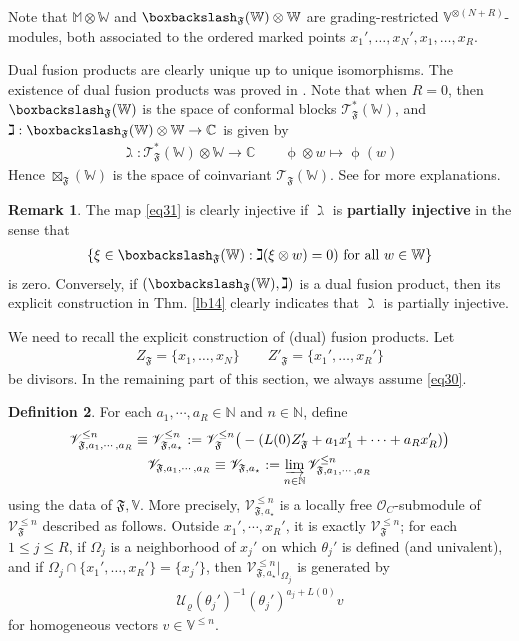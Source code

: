 \documentclass[11pt,b5paper,notitlepage]{article}
\theoremstyle{definition}
\newtheorem{df}{Definition}[section]
\newtheorem{rem}[df]{Remark}
\theoremstyle{plain}
\newcommand{\fk}{\mathfrak}
\newcommand{\SV}{\mathscr{V}}
\newcommand{\scr}{\mathscr}
\newcommand{\Vbb}{\mathbb V}
\newcommand{\Wbb}{\mathbb W}
\newcommand{\Mbb}{\mathbb M}
\newcommand{\Cbb}{\mathbb C}
\newcommand{\Nbb}{\mathbb N}
\newcommand{\<}{\left\langle}
\renewcommand{\>}{\right\rangle}
\newcommand{\MO}{\mathcal{O}}
\newcommand{\MU}{\mathcal{U}}
\newcommand{\ST}{\mathscr{T}}
\newcommand{\bbs}{\boxbackslash}
\newcommand{\ff}{\mathfrak{F}}
\numberwithin{equation}{section}
\begin{document}
Note that $\Mbb\otimes\Wbb$ and $\bbs_\fk F(\Wbb)\otimes\Wbb$ are grading-restricted $\Vbb^{\otimes{(N+R)}}$-modules, both associated to the ordered marked points $x_1',\dots,x_N',x_1,\dots,x_R$.

Dual fusion products are clearly unique up to unique isomorphisms. The existence of dual fusion products was proved in \cite[Thm. 3.31]{GZ1}. Note that when $R=0$, then  $\bbs_\ff(\Wbb)$ is the space of conformal blocks $\scr T_\ff^*(\Wbb)$, and $\gimel:\bbs_\ff(\Wbb)\otimes\Wbb\rightarrow\Cbb$ is given by
\begin{align*}
\gimel:\ST^*_\ff(\Wbb)\otimes\Wbb\rightarrow\Cbb\qquad \upphi\otimes w\mapsto\upphi(w)
\end{align*}
Hence $\boxtimes_{\fk F}(\Wbb)$ is the space of coinvariant $\scr T_{\fk F}(\Wbb)$. See \cite[Sec. 3.4]{GZ2} for more explanations.


\begin{rem}\label{lb15}
The map \eqref{eq31} is clearly injective if $\gimel$ is \textbf{partially injective} in the sense that
\begin{align*}
\{\xi\in\bbs_\ff(\Wbb):\gimel(\xi\otimes w)=0)\text{ for all }w\in\Wbb\}
\end{align*}
is zero.  Conversely, if $(\bbs_\ff(\Wbb),\gimel)$ is a dual fusion product, then its explicit construction in Thm. \ref{lb14} clearly indicates that $\gimel$ is partially injective.
\end{rem}


We need to recall the explicit construction of (dual) fusion products. Let
\begin{align}\label{eq36}
Z_\ff=\{x_1,\dots,x_N\}\qquad Z'_\ff=\{x_1',\dots,x_R'\}
\end{align}
be divisors. In the remaining part of this section, we always assume \eqref{eq30}.

\begin{df}\label{lb22}
For each $a_1,\cdots,a_R\in \Nbb$ and $n\in\Nbb$, define \index{VX@$\SV_{\ff,a_1,\cdots,a_R}^{\leq n}=\SV_{\ff,a_\star}^{\leq n}$}
\begin{gather*}
\SV_{\ff,a_1,\cdots,a_R}^{\leq n}\equiv\SV_{\ff,a_\star}^{\leq n}:=\SV_{\ff}^{\leq n}\big(-(L(0)Z'_\ff+a_1x_1'+\cdots+a_Rx_R')\big)\\
\SV_{\ff,a_1,\cdots,a_R}\equiv\SV_{\ff,a_\star}:=\varinjlim_{n\in \Nbb}\SV_{\ff,a_1,\cdots,a_R}^{\leq n}
\end{gather*}
using the data of $\ff,\Vbb$. More precisely, $\SV_{\ff,a_\star}^{\leq n}$ is a locally free $\MO_{C}$-submodule of $\SV_\ff^{\leq n}$ described as follows. Outside $x_1',\cdots,x_R'$, it is exactly $\SV_\ff^{\leq n}$; for each $1\leq j\leq R$, if $\Omega_j$ is a neighborhood of $x_j'$ on which $\theta_j'$ is defined (and univalent), and if $\Omega_j\cap\{x_1',\dots,x_R'\}=\{x_j'\}$, then $\SV_{\ff,a_\star}^{\leq n}\vert_{\Omega_j}$ is generated by 
\begin{gather}
\MU_\varrho(\theta_j')^{-1}(\theta_j')^{a_j+L(0)}v   
\end{gather}
for homogeneous vectors $v\in\Vbb^{\leq n}$.
\end{df}
\end{document}
